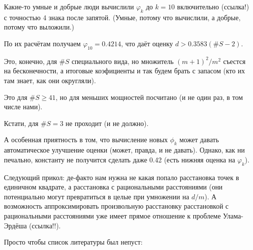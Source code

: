 \documentclass[a4paper,14pt]{article} %
\begin{document}
Какие-то умные и добрые люди вычислили $\varphi_k$ до $k=10$ включительно (ссылка!) с точностью 4 знака после запятой.
(Умные, потому что вычислили, а добрые, потому что выложили.)

По их расчётам получаем $\varphi_{10} = 0.4214$,
что даёт оценку $d>0.3583(\#S-2)$.

Это, конечно, для $\#S$ специального вида, но множитель $(m+1)^2 / m^2$ съестся на бесконечности,
а итоговые коэфициенты и так будем брать с запасом (кто их там знает, как они округляли).

Это для $\#S \geq 41$, но для меньших мощностей посчитано (и не один раз, в том числе нами).

Кстати, для $\#S = 3$ не проходит (и не должно).

А особенная приятность в том, что вычисление новых $\phi_k$ может давать автоматическое улучшение оценки
(может, правда, и не давать).
Однако, как ни печально, константу не получится сделать даже 0.42 (есть нижняя оценка на $\varphi_k$).

Следующий прикол:
де-факто нам нужна не какая попало расстановка точек в единичном квадрате,
а расстановка с рациональными расстояниями (они потенциально могут превратиться в целые при умножении на $d/m$).
А возможность аппроксимировать произвольную расстановку расстановкой с рациональными расстояниями
уже имеет прямое отношение к проблеме Улама-Эрдёша (ссылка!!).



Просто чтобы список литературы был непуст: \cite{our-mz-rus}
\printbibliography
\end{document}
